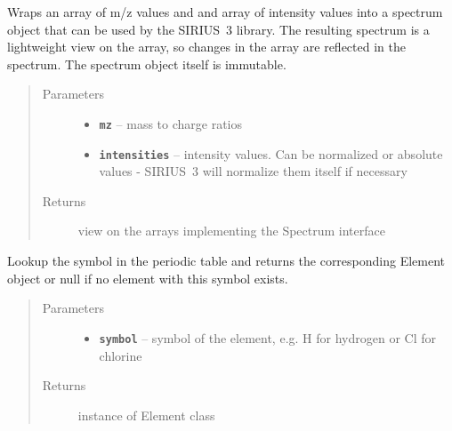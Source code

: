 \documentclass[letterpaper,10pt,openany,oneside]{sphinxmanual}
\begin{document}
\begin{fulllineitems}
\label{library:de.unijena.bioinf.sirius.wrapSpectrum(double__, double__)}
Wraps an array of m/z values and and array of intensity values into a spectrum object that can be used by the SIRIUS~3 library. The resulting spectrum is a lightweight view on the array, so changes in the array are reflected in the spectrum. The spectrum object itself is immutable.
\begin{quote}\begin{description}
\item[{Parameters}] \leavevmode\begin{itemize}
\item {} 
\textbf{\texttt{mz}} -- mass to charge ratios

\item {} 
\textbf{\texttt{intensities}} -- intensity values. Can be normalized or absolute values - SIRIUS~3 will normalize them itself if necessary

\end{itemize}

\item[{Returns}] \leavevmode
view on the arrays implementing the Spectrum interface

\end{description}\end{quote}

\end{fulllineitems}


\begin{fulllineitems}
\label{library:de.unijena.bioinf.sirius.getElement(String)}
Lookup the symbol in the periodic table and returns the corresponding Element object or null if no element with this symbol exists.
\begin{quote}\begin{description}
\item[{Parameters}] \leavevmode\begin{itemize}
\item {} 
\textbf{\texttt{symbol}} -- symbol of the element, e.g. H for hydrogen or Cl for chlorine

\end{itemize}

\item[{Returns}] \leavevmode
instance of Element class

\end{description}\end{quote}

\end{fulllineitems}
\end{document}
